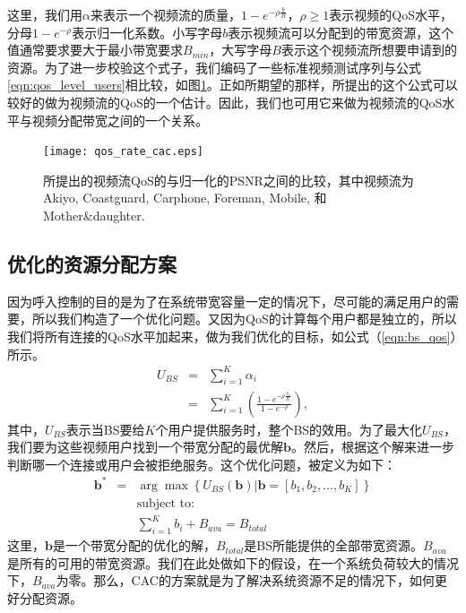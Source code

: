这里，我们用$\alpha$来表示一个视频流的质量，$1- e^{-\rho \frac{b}{B}}，\rho \ge 1$表示视频的QoS水平，分母${1-e^{-\rho}}$表示归一化系数。小写字母$b$表示视频流可以分配到的带宽资源，这个值通常要求要大于最小带宽要求$B_{min}$，大写字母$B$表示这个视频流所想要申请到的资源。为了进一步校验这个式子，我们编码了一些标准视频测试序列与公式\ref{eqn:qos_level_users}相比较，如图\ref{fig_qos_rate_cac}。正如所期望的那样，所提出的这个公式可以较好的做为视频流的QoS的一个估计。因此，我们也可用它来做为视频流的QoS水平与视频分配带宽之间的一个关系。
\begin{figure}[tb]
\begin{center}
\texttt{[image: qos\_rate\_cac.eps]}
\end{center}
\caption{所提出的视频流QoS的与归一化的PSNR之间的比较，其中视频流为 Akiyo, Coastguard, Carphone, Foreman, Mobile, 和 Mother\&daughter. } 
\label{fig_qos_rate_cac}
\end{figure}

\subsection{优化的资源分配方案}
因为呼入控制的目的是为了在系统带宽容量一定的情况下，尽可能的满足用户的需要，所以我们构造了一个优化问题。又因为QoS的计算每个用户都是独立的，所以我们将所有连接的QoS水平加起来，做为我们优化的目标，如公式（\ref{eqn:bs_qos}）所示。
\begin{eqnarray}
U_{BS} &=& \displaystyle \sum_{i=1}^K \alpha_i \nonumber \\
&=&\displaystyle \sum_{i=1}^K \left( \frac{1- e^{-\rho
\frac{b_i}{B_i} }}{1-e^{-\rho}} \right) ,\label{eqn:bs_qos}
\end{eqnarray}
其中，$U_{BS}$表示当BS要给$K$个用户提供服务时，整个BS的效用。为了最大化$U_{BS}$，我们要为这些视频用户找到一个带宽分配的最优解$\mathbf{b}$。然后，根据这个解来进一步判断哪一个连接或用户会被拒绝服务。这个优化问题，被定义为如下：
\begin{eqnarray}{}
\mathbf{b}^* &=& \arg \max \left\{ U_{BS}(\mathbf{b}) \big| \mathbf{b} = [b_1, b_2, \dots, b_K] \right\} \label{eqn_u_bs_qos}\\
& &\text{subject to:}\nonumber\\
& &\displaystyle\sum_{i=1}^{K}b_i + B_{ava}= B_{total} \nonumber
\end{eqnarray}
这里，$\mathbf{b}$是一个带宽分配的优化的解，$B_{total}$是BS所能提供的全部带宽资源。$B_{ava}$是所有的可用的带宽资源。我们在此处做如下的假设，在一个系统负荷较大的情况下，$B_{ava}$为零。那么，CAC的方案就是为了解决系统资源不足的情况下，如何更好分配资源。
%
\vspace{3mm}

